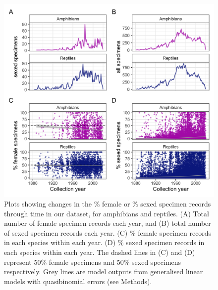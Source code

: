 \documentclass[a4paper, 12pt]{article}
\begin{document}
\newpage
\begin{figure}[h]
 \centering
  \includegraphics[width = \linewidth]{figures/years-combined-totals.png}
  \caption{Plots showing changes in the \% female or \% sexed specimen records through time in our dataset, for amphibians and reptiles. (A) Total number of female specimen records each year, and (B) total number of sexed specimen records each year. (C) \% female specimen records in each species within each year. (D) \% sexed specimen records in each species within each year. The dashed lines in (C) and (D) represent 50\% female specimens and 50\% sexed specimens respectively. Grey lines are model outputs from generalised linear models with quasibinomial errors (see Methods).}
  \label{fig-time}
\end{figure}
\end{document}
